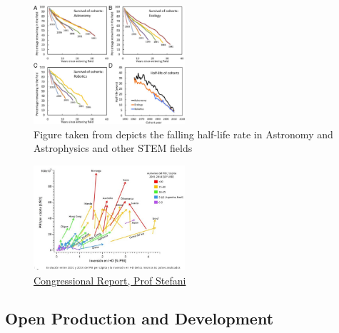 \documentclass[final,5p,times,twocolumn,authoryear]{elsarticle}
\begin{document}
\begin{figure}[h!]
    \centering
  \caption{Figure taken from \cite{milo_2018} depicts the falling half-life rate in Astronomy and Astrophysics and other STEM fields}
  \label{fig:F4.large}
  \includegraphics[width=0.5\textwidth]{figs/F4.large.jpg}
\end{figure}

\begin{figure}
    \centering
    \includegraphics[width=0.5\textwidth]{figs/Docuemnto_Stefani_2.jpg}
    \caption{\href{https://aargentinapciencias.org/wp-content/uploads/2019/05/Docuemnto_Stefani.pdf}{Congressional Report, Prof Stefani}}
\end{figure}
\subsection{Open Production and Development}
\end{document}
